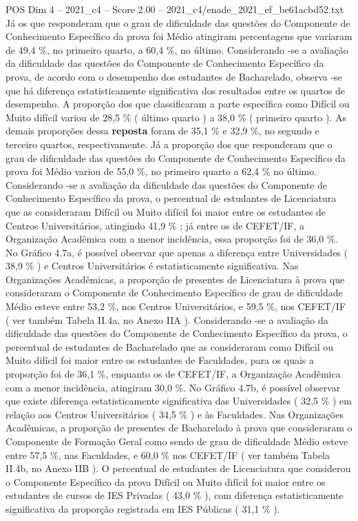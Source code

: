 \begin{textsample}{POS Dim 4 – 2021\_c4 – Score 2.00 – 2021\_c4/enade\_2021\_ef\_be61acbd52.txt}
Já os que responderam que o grau de dificuldade das questões do Componente de Conhecimento Específico da prova foi Médio atingiram percentagens que variaram de 49,4 \%, no primeiro quarto, a 60,4 \%, no último.
Considerando -se a avaliação da dificuldade das questões do Componente de Conhecimento Específico da prova, de acordo com o desempenho dos estudantes de Bacharelado, observa -se que há diferença estatisticamente significativa dos resultados entre os quartos de desempenho.
A proporção dos que classificaram a parte específica como Difícil ou Muito difícil variou de 28,5 \% ( último quarto ) a 38,0 \% ( primeiro quarto ).
As demais proporções dessa \textbf{reposta} foram de 35,1 \% e 32,9 \%, no segundo e terceiro quartos, respectivamente.
Já a proporção dos que responderam que o grau de dificuldade das questões do Componente de Conhecimento Específico da prova foi Médio variou de 55,0 \%, no primeiro quarto a 62,4 \% no último.
Considerando -se a avaliação da dificuldade das questões do Componente de Conhecimento Específico da prova, o percentual de estudantes de Licenciatura que as consideraram Difícil ou Muito difícil foi maior entre os estudantes de Centros Universitários, atingindo 41,9 \% ; já entre os de CEFET/IF, a Organização Acadêmica com a menor incidência, essa proporção foi de 36,0 \%.
No Gráfico 4.7a, é possível observar que apenas a diferença entre Universidades ( 38,9 \% ) e Centros Universitários é estatisticamente significativa.
Nas Organizações Acadêmicas, a proporção de presentes de Licenciatura à prova que consideraram o Componente de Conhecimento Específico de grau de dificuldade Médio esteve entre 53,2 \%, nos Centros Universitários, e 59,5 \%, nos CEFET/IF ( ver também Tabela II.4a, no Anexo IIA ).
Considerando -se a avaliação da dificuldade das questões do Componente de Conhecimento Específico da prova, o percentual de estudantes de Bacharelado que as consideraram como Difícil ou Muito difícil foi maior entre os estudantes de Faculdades, para os quais a proporção foi de 36,1 \%, enquanto os de CEFET/IF, a Organização Acadêmica com a menor incidência, atingiram 30,0 \%.
No Gráfico 4.7b, é possível observar que existe diferença estatisticamente significativa das Universidades ( 32,5 \% ) em relação aos Centros Universitários ( 34,5 \% ) e às Faculdades.
Nas Organizações Acadêmicas, a proporção de presentes de Bacharelado à prova que consideraram o Componente de Formação Geral como sendo de grau de dificuldade Médio esteve entre 57,5 \%, nas Faculdades, e 60,0 \% nos CEFET/IF ( ver também Tabela II.4b, no Anexo IIB ).
O percentual de estudantes de Licenciatura que considerou o Componente Específico da prova Difícil ou Muito difícil foi maior entre os estudantes de cursos de IES Privadas ( 43,0 \% ), com diferença estatisticamente significativa da proporção registrada em IES Públicas ( 31,1 \% ).

\end{textsample}
